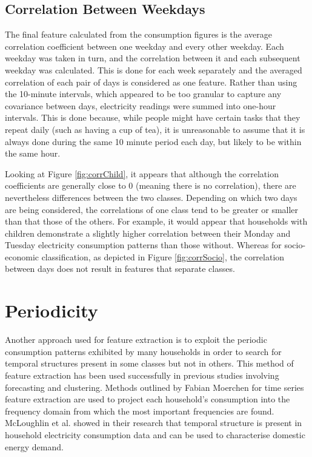 \subsection*{Correlation Between Weekdays}

The final feature calculated from the consumption figures is the average correlation coefficient between one weekday and every other weekday.  Each weekday was taken in turn, and the correlation between it and each subsequent weekday was calculated. This is done for each week separately and the averaged correlation of each pair of days is considered as one feature. Rather than using the 10-minute intervals, which appeared to be too granular to capture any covariance between days, electricity readings were summed into one-hour intervals. This is done because, while people might have certain tasks that they repeat daily (such as having a cup of tea), it is unreasonable to assume that it is always done during the same 10 minute period each day, but likely to be within the same hour.  



\corrChild %

Looking at Figure \ref{fig:corrChild}, it appears that although the correlation coefficients are generally close to 0 (meaning there is no correlation), there are nevertheless differences between the two classes. Depending on which two days are being considered, the correlations of one class tend to be greater or smaller than that those of the others. For example, it would appear that households with children demonstrate a slightly higher correlation between their Monday and Tuesday electricity consumption patterns than those without. Whereas for socio-economic classification, as depicted in Figure \ref{fig:corrSocio}, the correlation between days does not result in features that separate classes.

\corrSocio %


\section{Periodicity}

Another approach used for feature extraction is to exploit the periodic consumption patterns exhibited by many households in order to search for temporal structures present in some classes but not in others. This method of feature extraction has been used successfully in previous studies involving forecasting and clustering. Methods outlined by Fabian Moerchen \cite{Moerchen} for time series feature extraction are used to project each household's consumption into the frequency domain from which the most important frequencies are found. McLoughlin et al. \cite{McLoughlin} showed in their research that temporal structure is present in household electricity consumption data and can be used to characterise domestic energy demand.


